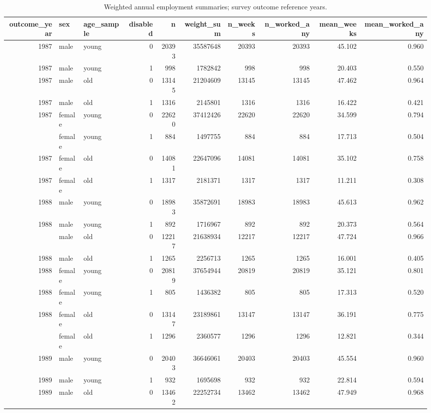 \begin{table}

\caption{Weighted annual employment summaries; survey outcome reference years.}
\centering
\begin{tabular}[t]{rllrrrrrrr}
\toprule
outcome\_year & sex & age\_sample & disabled & n & weight\_sum & n\_weeks & n\_worked\_any & mean\_weeks & mean\_worked\_any\\
\midrule
1987 & male & young & 0 & 20393 & 35587648 & 20393 & 20393 & 45.102 & 0.960\\
1987 & male & young & 1 & 998 & 1782842 & 998 & 998 & 20.403 & 0.550\\
1987 & male & old & 0 & 13145 & 21204609 & 13145 & 13145 & 47.462 & 0.964\\
1987 & male & old & 1 & 1316 & 2145801 & 1316 & 1316 & 16.422 & 0.421\\
1987 & female & young & 0 & 22620 & 37412426 & 22620 & 22620 & 34.599 & 0.794\\
\addlinespace
1987 & female & young & 1 & 884 & 1497755 & 884 & 884 & 17.713 & 0.504\\
1987 & female & old & 0 & 14081 & 22647096 & 14081 & 14081 & 35.102 & 0.758\\
1987 & female & old & 1 & 1317 & 2181371 & 1317 & 1317 & 11.211 & 0.308\\
1988 & male & young & 0 & 18983 & 35872691 & 18983 & 18983 & 45.613 & 0.962\\
1988 & male & young & 1 & 892 & 1716967 & 892 & 892 & 20.373 & 0.564\\
\addlinespace
1988 & male & old & 0 & 12217 & 21638934 & 12217 & 12217 & 47.724 & 0.966\\
1988 & male & old & 1 & 1265 & 2256713 & 1265 & 1265 & 16.001 & 0.405\\
1988 & female & young & 0 & 20819 & 37654944 & 20819 & 20819 & 35.121 & 0.801\\
1988 & female & young & 1 & 805 & 1436382 & 805 & 805 & 17.313 & 0.520\\
1988 & female & old & 0 & 13147 & 23189861 & 13147 & 13147 & 36.191 & 0.775\\
\addlinespace
1988 & female & old & 1 & 1296 & 2360577 & 1296 & 1296 & 12.821 & 0.344\\
1989 & male & young & 0 & 20403 & 36646061 & 20403 & 20403 & 45.554 & 0.960\\
1989 & male & young & 1 & 932 & 1695698 & 932 & 932 & 22.814 & 0.594\\
1989 & male & old & 0 & 13462 & 22252734 & 13462 & 13462 & 47.949 & 0.968\\

\end{tabular}
\end{table}
